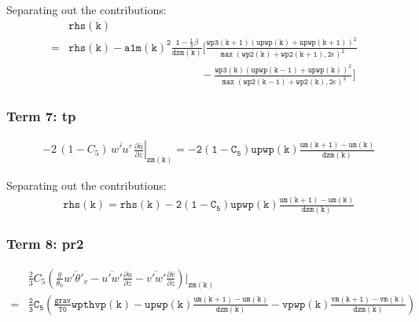 \documentclass[11pt,fleqn]{article}
\newcommand{\ptlder}[2]{\frac{\partial #1}{\partial #2}}
\begin{document}
%
Separating out the contributions:
%
\begin{equation}
\begin{split}
&\mathtt{rhs(k)} \\
=& \mathtt{
   rhs(k)
   - a1m(k)^{2} \frac{1 - \frac{1}{3}\beta}{dzm(k)}
     \bigg[ \frac{wp3(k+1) \left(upwp(k)+upwp(k+1)\right)^2}
                 {\max\left(wp2(k)+wp2(k+1),2\epsilon\right)^2} } \\
 & \mathtt{ \quad \quad \quad \quad \qquad \qquad \qquad \qquad
           -\frac{wp3(k) \left(upwp(k-1)+upwp(k)\right)^2}
                 {\max\left(wp2(k-1)+wp2(k),2\epsilon\right)^2}
     \bigg]
   }
\end{split}
\end{equation}

\subsubsection{Term 7:  tp}
%
\begin{equation}
\begin{split}
&\left. - 2 \, \left( 1 - C_5 \right) \, \overline{w'u'} \, \ptlder{\bar{u}}{z} \right|_{\mathtt{zm(k)}}
 = \mathtt{ - 2 \left( 1 - C_5 \right) upwp(k) \frac{um(k+1)-um(k)}{dzm(k)} }
\end{split}
\end{equation}
%

Separating out the contributions:
%
\begin{equation}
\begin{split}
&\mathtt{rhs(k) = rhs(k) - 2 \left(1 - C_5\right) upwp(k) \frac{um(k+1)-um(k)}{dzm(k)} }
\end{split}
\end{equation}
%


\subsubsection{Term 8:  pr2}
%
\begin{equation}
\begin{split}
&  \frac{2}{3} C_5
   \left(
      \frac{g}{\theta_0} \overline{w'\theta'_v}
      - \overline{u'w'}\ptlder{\bar{u}}{z} 
      - \overline{v'w'}\ptlder{\bar{v}}{z} 
   \right) \left. \right|_{\mathtt{zm(k)}} \\
=& \mathtt{ 
   \frac{2}{3} C_5 
   \left(
   \frac{grav}{T0} wpthvp(k) 
   - upwp(k) \frac{um(k+1)-um(k)}{dzm(k)}
   - vpwp(k) \frac{vm(k+1)-vm(k)}{dzm(k)}
   \right)
   }
\end{split}
\end{equation}
\end{document}
